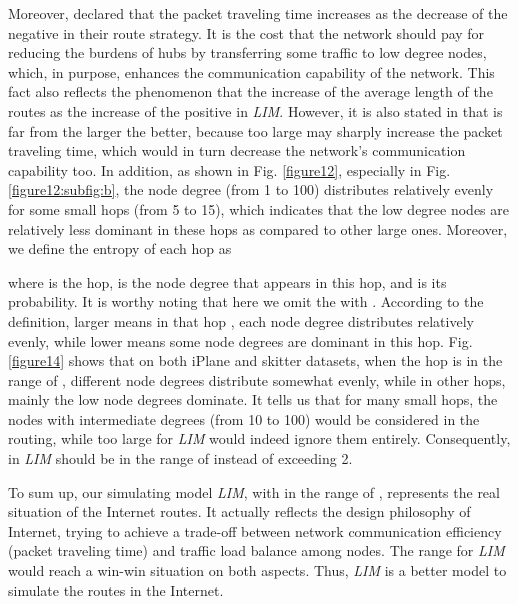 \documentclass[a4paper]{llncs}
\begin{document}
Moreover, \cite{TrafficDynamicLocal,EfficientRouting}
declared that the packet traveling time increases as the decrease of the negative  in their route
strategy. It is the cost that the network should pay for reducing the burdens of hubs by transferring some traffic to low degree nodes, which, in purpose, enhances the communication capability of the network. This fact also reflects the phenomenon that the increase of the average length of the routes as the increase of the positive  in \textit{LIM}.
However, it is also stated in \cite{TrafficDynamicLocal,EfficientRouting} that  is far from the larger the better, because too large  may sharply increase the packet traveling time, which would in turn decrease the network's communication capability too. In addition, as shown in Fig. \ref{figure12}, especially in Fig. \ref{figure12:subfig:b}, the node degree (from 1 to 100) distributes relatively evenly for some small hops (from 5 to 15), which indicates that the low degree nodes are relatively less dominant in these hops as compared to other large ones. Moreover, we define the entropy of each hop as

where  is the hop,  is the node degree that appears in this hop, and  is its probability. It is worthy noting that here we omit the  with . According to the definition, larger  means in that hop , each node degree distributes relatively evenly, while lower  means some node degrees are dominant in this hop. Fig. \ref{figure14} shows that on both iPlane and skitter datasets, when the hop is in the range of , different node degrees distribute somewhat evenly, while in other hops, mainly the low node degrees dominate. It tells us that for many small hops, the nodes with intermediate degrees (from 10 to 100) would be considered in the routing, while too large  for \textit{LIM} would indeed ignore them entirely. Consequently,  in \textit{LIM} should be in the range of  instead of exceeding 2.

To sum up, our simulating model \textit{LIM}, with  in the range of , represents the real situation of the
Internet routes. It actually reflects the design philosophy of Internet, trying to achieve a trade-off between network communication efficiency (packet traveling time) and traffic load balance among nodes. The  range  for \textit{LIM} would reach a win-win situation on both aspects. Thus, \textit{LIM} is a better model to simulate the routes in the Internet.
\end{document}
